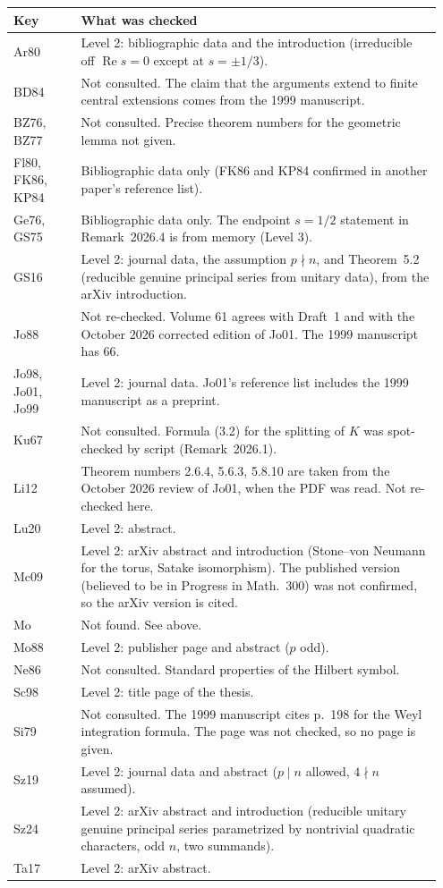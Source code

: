 \documentclass[12pt,letterpaper]{article}
\begin{document}
\begin{longtable}{@{}>{\raggedright\arraybackslash}p{0.15\linewidth}>{\raggedright\arraybackslash}p{0.80\linewidth}@{}}
\toprule
Key & What was checked\\
\midrule
\endhead
Ar80 & Level 2: bibliographic data and the introduction (irreducible
off $\operatorname{Re}s=0$ except at $s=\pm1/3$).\\
BD84 & Not consulted. The claim that the arguments extend to finite
central extensions comes from the 1999 manuscript.\\
BZ76, BZ77 & Not consulted. Precise theorem numbers for the geometric
lemma not given.\\
Fl80, FK86, KP84 & Bibliographic data only (FK86 and KP84 confirmed in
another paper's reference list).\\
Ge76, GS75 & Bibliographic data only. The endpoint $s=1/2$ statement in
Remark~2026.4 is from memory (Level 3).\\
GS16 & Level 2: journal data, the assumption $p\nmid n$, and
Theorem~5.2 (reducible genuine principal series from unitary data),
from the arXiv introduction.\\
Jo88 & Not re-checked. Volume 61 agrees with Draft~1 and with the
October 2026 corrected edition of Jo01. The 1999 manuscript has 66.\\
Jo98, Jo01, Jo99 & Level 2: journal data. Jo01's reference list
includes the 1999 manuscript as a preprint.\\
Ku67 & Not consulted. Formula (3.2) for the splitting of $K$ was
spot-checked by script (Remark~2026.1).\\
Li12 & Theorem numbers 2.6.4, 5.6.3, 5.8.10 are taken from the October
2026 review of Jo01, when the PDF was read. Not re-checked here.\\
Lu20 & Level 2: abstract.\\
Mc09 & Level 2: arXiv abstract and introduction (Stone--von Neumann
for the torus, Satake isomorphism). The published version (believed to
be in Progress in Math.~300) was not confirmed, so the arXiv version is
cited.\\
Mo & Not found. See above.\\
Mo88 & Level 2: publisher page and abstract ($p$ odd).\\
Ne86 & Not consulted. Standard properties of the Hilbert symbol.\\
Sc98 & Level 2: title page of the thesis.\\
Si79 & Not consulted. The 1999 manuscript cites p.~198 for the Weyl
integration formula. The page was not checked, so no page is given.\\
Sz19 & Level 2: journal data and abstract ($p\mid n$ allowed,
$4\nmid n$ assumed).\\
Sz24 & Level 2: arXiv abstract and introduction (reducible unitary
genuine principal series parametrized by nontrivial quadratic
characters, odd $n$, two summands).\\
Ta17 & Level 2: arXiv abstract.\\
\bottomrule
\end{longtable}
\end{document}
